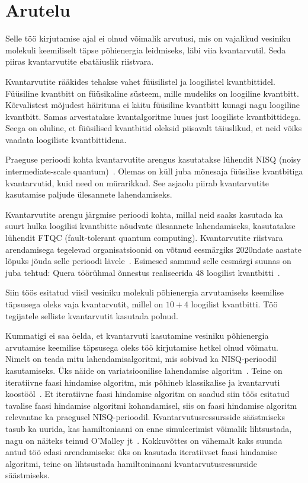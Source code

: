 \documentclass[12pt]{report}
\begin{document}
\section{Arutelu}\label{chap:discussion}

Selle töö kirjutamise ajal ei olnud võimalik arvutusi, mis on vajalikud vesiniku molekuli keemiliselt täpse põhienergia leidmiseks, läbi viia kvantarvutil.
Seda piiras kvantarvutite ebatäiuslik riistvara.

Kvantarvutite rääkides tehakse vahet füüsilistel ja loogilistel kvantbittidel.
Füüsiline kvantbitt on füüsikaline süsteem, mille mudeliks on loogiline kvantbitt.
Kõrvalistest mõjudest häirituna ei käitu füüsiline kvantbitt kunagi nagu loogiline kvantbitt.
Samas arvestatakse kvantalgoritme luues just loogiliste kvantbittidega.
Seega on oluline, et füüsilised kvantbitid oleksid piisavalt täiuslikud, et neid võiks vaadata loogiliste kvantbittidena.

Praeguse perioodi kohta kvantarvutite arengus kasutatakse lühendit NISQ (noisy inter\-me\-diate-scale quantum)~\cite{preskill}.
Olemas on küll juba mõnesaja füüsilise kvantbitiga kvantarvutid, kuid need on mürarikkad.
See asjaolu piirab kvantarvutite kasutamise paljude ülesannete lahendamiseks.

Kvantarvutite arengu järgmise perioodi kohta, millal neid saaks kasutada ka suurt hulka loogilisi kvantbitte nõudvate ülesannete lahendamiseks, kasutatakse lühendit FTQC (fault-tolerant quantum computing).
Kvantarvutite riistvara arendamisega tegelevad organisatsioonid on võtnud eesmärgiks 2020ndate aastate lõpuks jõuda selle perioodi lävele~\cite{ibmq+roadmap, quera+roadmap}.
Esimesed sammud selle eesmärgi suunas on juba tehtud: Quera töörühmal õnnestus realiseerida 48 loogilist kvantbitti~\cite{quera}.

Siin töös esitatud viisil vesiniku molekuli põhienergia arvutamiseks keemilise täpsusega oleks vaja kvantarvutit, millel on \(10 + 4\) loogilist kvantbitti.
Töö tegijatele selliste kvantarvutit kasutada polnud.

Kummatigi ei saa öelda, et kvantarvuti kasutamine vesiniku põhienergia arvutamise keemilise täpsusega oleks töö kirjutamise hetkel olnud võimatu.
Nimelt on teada mitu lahendamis\-algoritmi, mis sobivad ka NISQ-perioodil kasutamiseks.
Üks näide on variatsioonilise lahendamise algoritm~\cite{omalley+etal, raidlo}.
Teine on  iteratiivne faasi hindamise algoritm, mis põhineb klassikalise ja kvantarvuti koostööl~\cite{omalley+etal}.
Et iteratiivne faasi hindamise algoritm on saadud siin töös esitatud tavalise faasi hindamise algoritmi kohandamisel, siis on faasi hindamise algoritm relevantne ka praegusel NISQ-perioodil.
Kvantarvutusressursside säästmiseks tasub ka uurida, kas hamiltoniaani on enne simuleerimist võimalik lihtsustada, nagu on näiteks teinud O'Malley jt~\cite{omalley+etal}.
Kokkuvõttes on vähemalt kaks suunda antud töö edasi arendamiseks: üks on kasutada iteratiivset faasi hindamise algoritmi, teine on lihtsustada hamiltoninaani kvantarvutusressurside säästmiseks.
\end{document}
